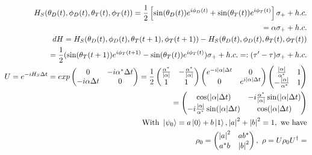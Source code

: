 \begin{align*}
	H_S(\theta_D(t), \phi_D(t), \theta_T(t), \phi_T(t)) = \frac{1}{2} \left[\sin(\theta_D(t)) e^{i\phi_D(t)} + \sin(\theta_T(t)) e^{i\phi_T(t)}\right] \sigma_{+} + h.c. \\
	= \alpha \sigma_{+} + h.c. \\
	dH = H_S(\theta_D(t), \phi_D(t), \theta_T(t+1), \phi_T(t+1)) - H_S(\theta_D(t), \phi_D(t), \theta_T(t), \phi_T(t)) \\
	= \frac{1}{2}(\sin(\theta_T(t+1))e^{i\phi_T(t+1)} - \sin(\theta_T(t))e^{i\phi_T(t)}) \sigma_{+} + h.c. =: (\tau' - \tau) \sigma_{+} + h.c. \\
	U = e^{-iH_S \Delta t} = 
	exp \begin{pmatrix}
	0 & -i\alpha^* \Delta t \\
	-i \alpha \Delta t & 0 \\
	\end{pmatrix} = 
	\frac{1}{2} \begin{pmatrix}
	\frac{\alpha^*}{\abs{\alpha}} & -\frac{\alpha^*}{\abs{\alpha}} \\
	1 & 1 \\
	\end{pmatrix}
	\begin{pmatrix}
	e^{-i\abs{\alpha} \Delta t} & 0 \\
	0 & e^{i\abs{\alpha} \Delta t} \\
	\end{pmatrix}
	\begin{pmatrix}
	\frac{\abs{\alpha}}{\alpha^*} & 1 \\
	-\frac{\abs{\alpha}}{\alpha^*} & 1 \\
	\end{pmatrix} \\
	= \begin{pmatrix}
	\cos(\abs{\alpha}\Delta t) & -i\frac{\alpha^*}{\abs{\alpha}} \sin(\abs{\alpha}\Delta t) \\
	-i\frac{\abs{\alpha}}{\alpha^*} \sin(\abs{\alpha}\Delta t) & \cos(\abs{\alpha} \Delta t) \\
	\end{pmatrix} \\
	\mathrm{With} \ \ket{\psi_0} = a \ket{0} + b \ket{1}, \abs{a}^2 + \abs{b}^2 = 1, \ \mathrm{we \ have} \\
	\rho_0 = \begin{pmatrix}
	\abs{a}^2 & a b ^* \\
	a^* b & \abs{b}^2 \\
	\end{pmatrix}, \ \rho = U \rho_0 U^\dagger = \\

\end{align*}
